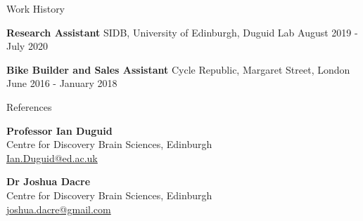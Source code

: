 \documentclass{resume} %
\begin{document}
\begin{rSection}{Work History}
\vspace{-1.25em}
\item \textbf{Research Assistant} {SIDB, University of Edinburgh, Duguid Lab} \hfill August 2019 - July 2020
\item \textbf{Bike Builder and Sales Assistant} {Cycle Republic, Margaret Street, London} \hfill June 2016 - January 2018
\end{rSection} 

\begin{rSection}{References}
\noindent
\begin{minipage}{.5\textwidth}
  \textbf{Professor Ian Duguid}\\
  Centre for Discovery Brain Sciences, Edinburgh\\
  \href{mailto:Ian.Duguid@ed.ac.uk}{Ian.Duguid@ed.ac.uk}
\end{minipage}%
\begin{minipage}{.5\textwidth}
  \textbf{Dr Joshua Dacre}\\
  Centre for Discovery Brain Sciences, Edinburgh\\
  \href{joshua.dacre@gmail.com}{joshua.dacre@gmail.com}
\end{minipage}



\end{rSection}

\end{document}
